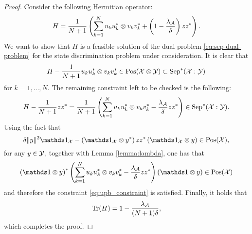 \begin{proof}
  Consider the following Hermitian operator:
  \begin{equation}
    H = \frac{1}{N+1} \left( \sum_{k = 1}^{N}u_{k}u_{k}^{\ast}\otimes 
    v_{k}v_{k}^{\ast} + \left( 1- \frac{\lambda_{\mathcal{A}}}{\delta} \right) 
    zz^{\ast} \right).
  \end{equation}
  We want to show that $H$ is a feasible solution of the dual problem
  \eqref{eq:sep-dual-problem} for the state discrimination problem under
  consideration.
  It is clear that
  \begin{equation}
    H - \frac{1}{N+1}u_{k}u_{k}^{\ast}\otimes v_{k}v_{k}^{\ast} \in 
    \mathrm{Pos}(\mathcal{X}\otimes\mathcal{Y}) \subset \mathrm{Sep}^{\ast}(\mathcal{X}:\mathcal{Y})
  \end{equation}
  for $k = 1, \ldots, N$. 
  The remaining constraint left to be checked is the following:
  \begin{equation}
    \label{eq:upb_constraint} 
    H - \frac{1}{N+1}zz^{\ast} = 
    \frac{1}{N+1}\left(
    \sum_{k = 1}^{N}u_{k}u_{k}^{\ast}\otimes v_{k}v_{k}^{\ast} -
    \frac{\lambda_{\mathcal{A}}}{\delta} zz^{\ast} \right) \in \mathrm{Sep}^{\ast}(\mathcal{X}:\mathcal{Y}).
  \end{equation}
  Using the fact that
  \begin{equation}
    \delta\norm{y}^{2}\I_{\X} - 
    \left(\I_{\X} \otimes y^{\ast}\right)zz^{\ast}\left(\I_{\X} \otimes y\right)
    \in \Pos(\X),
  \end{equation} 
  for any $y \in \mathcal{Y}$, together with Lemma \ref{lemma:lambda}, one has that
  \begin{equation}
    \left( \I \otimes y \right)^{\ast}
    \left(\sum_{k = 1}^{N}u_{k}u_{k}^{\ast}\otimes v_{k}v_{k}^{\ast} -
    \frac{\lambda_{\A}}{\delta} zz^{\ast}\right)
    \left( \I \otimes y \right) \in \Pos(\X)
  \end{equation}
  and therefore the constraint \eqref{eq:upb_constraint} is satisfied.
  Finally, it holds that
  \begin{equation}
    \operatorname{Tr}(H) = 1 - \frac{\lambda_{\mathcal{A}}}{(N + 1)\delta},
  \end{equation}
  which completes the proof.
\end{proof}


